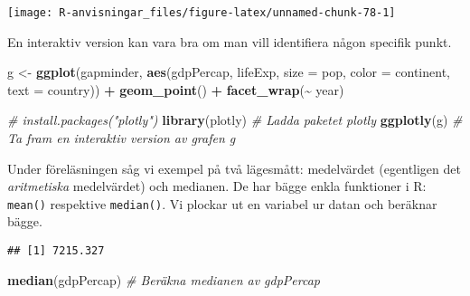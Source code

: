 \documentclass[
]{book}
\newenvironment{Shaded}{\begin{snugshade}}{\end{snugshade}}
\newcommand{\AttributeTok}[1]{\textcolor[rgb]{0.13,0.29,0.53}{#1}}
\newcommand{\CommentTok}[1]{\textcolor[rgb]{0.56,0.35,0.01}{\textit{#1}}}
\newcommand{\FunctionTok}[1]{\textcolor[rgb]{0.13,0.29,0.53}{\textbf{#1}}}
\newcommand{\NormalTok}[1]{#1}
\newcommand{\OtherTok}[1]{\textcolor[rgb]{0.56,0.35,0.01}{#1}}
\newcommand{\SpecialCharTok}[1]{\textcolor[rgb]{0.81,0.36,0.00}{\textbf{#1}}}
\theoremstyle{definition}
\theoremstyle{definition}
\theoremstyle{definition}
\theoremstyle{definition}
\theoremstyle{remark}
\begin{document}
\begin{center}\texttt{[image: R-anvisningar\_files/figure-latex/unnamed-chunk-78-1]} \end{center}

En interaktiv version kan vara bra om man vill identifiera någon specifik punkt.

\begin{Shaded}
\begin{Highlighting}[]
\NormalTok{g }\OtherTok{\textless{}{-}} \FunctionTok{ggplot}\NormalTok{(gapminder, }\FunctionTok{aes}\NormalTok{(gdpPercap, lifeExp, }\AttributeTok{size =}\NormalTok{ pop, }\AttributeTok{color =}\NormalTok{ continent, }\AttributeTok{text =}\NormalTok{ country)) }\SpecialCharTok{+}
  \FunctionTok{geom\_point}\NormalTok{() }\SpecialCharTok{+}
  \FunctionTok{facet\_wrap}\NormalTok{(}\SpecialCharTok{\textasciitilde{}}\NormalTok{ year)}

\CommentTok{\# install.packages("plotly")}
\FunctionTok{library}\NormalTok{(plotly)                        }\CommentTok{\# Ladda paketet plotly}
\FunctionTok{ggplotly}\NormalTok{(g)                            }\CommentTok{\# Ta fram en interaktiv version av grafen g}
\end{Highlighting}
\end{Shaded}

Under föreläsningen såg vi exempel på två lägesmått: medelvärdet (egentligen det \emph{aritmetiska} medelvärdet) och medianen. De har bägge enkla funktioner i R: \texttt{mean()} respektive \texttt{median()}. Vi plockar ut en variabel ur datan och beräknar bägge.

\begin{Shaded}
\end{Shaded}

\begin{verbatim}
## [1] 7215.327
\end{verbatim}

\begin{Shaded}
\begin{Highlighting}[]
\FunctionTok{median}\NormalTok{(gdpPercap)                      }\CommentTok{\# Beräkna medianen av gdpPercap}
\end{Highlighting}
\end{Shaded}
\end{document}
